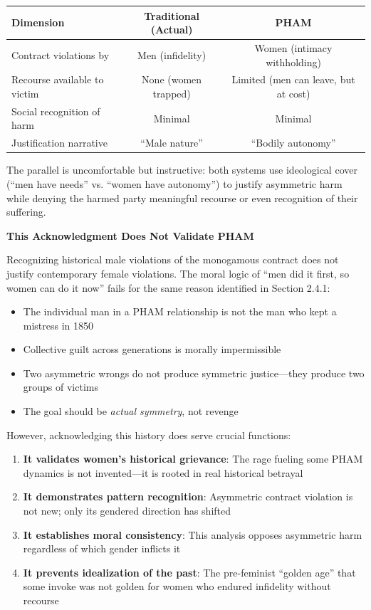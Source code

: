 \documentclass[12pt, letterpaper]{article}
\begin{document}
\begin{center}
\begin{tabular}{|l|c|c|}
\hline
\textbf{Dimension} & \textbf{Traditional (Actual)} & \textbf{PHAM} \\
\hline
Contract violations by & Men (infidelity) & Women (intimacy withholding) \\
Recourse available to victim & None (women trapped) & Limited (men can leave, but at cost) \\
Social recognition of harm & Minimal & Minimal \\
Justification narrative & ``Male nature'' & ``Bodily autonomy'' \\
\hline
\end{tabular}
\end{center}

The parallel is uncomfortable but instructive: both systems use ideological cover (``men have needs'' vs. ``women have autonomy'') to justify asymmetric harm while denying the harmed party meaningful recourse or even recognition of their suffering.

\textbf{This Acknowledgment Does Not Validate PHAM}

Recognizing historical male violations of the monogamous contract does not justify contemporary female violations. The moral logic of ``men did it first, so women can do it now'' fails for the same reason identified in Section 2.4.1:

\begin{itemize}
    \item The individual man in a PHAM relationship is not the man who kept a mistress in 1850
    \item Collective guilt across generations is morally impermissible
    \item Two asymmetric wrongs do not produce symmetric justice---they produce two groups of victims
    \item The goal should be \textit{actual symmetry}, not revenge
\end{itemize}

However, acknowledging this history does serve crucial functions:

\begin{enumerate}
    \item \textbf{It validates women's historical grievance}: The rage fueling some PHAM dynamics is not invented---it is rooted in real historical betrayal
    \item \textbf{It demonstrates pattern recognition}: Asymmetric contract violation is not new; only its gendered direction has shifted
    \item \textbf{It establishes moral consistency}: This analysis opposes asymmetric harm regardless of which gender inflicts it
    \item \textbf{It prevents idealization of the past}: The pre-feminist ``golden age'' that some invoke was not golden for women who endured infidelity without recourse
\end{enumerate}
\end{document}

